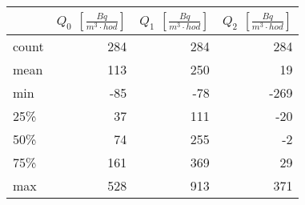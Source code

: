 \begin{tabular}{lrrr}
\toprule
{} &  $Q_0$ $\left[\si{\frac{Bq}{m^3\cdot hod}}\right]$ &  $Q_1$ $\left[\si{\frac{Bq}{m^3\cdot hod}}\right]$ &  $Q_2$ $\left[\si{\frac{Bq}{m^3\cdot hod}}\right]$ \\
\midrule
count &                                                284 &                                                284 &                                                284 \\
mean  &                                                113 &                                                250 &                                                 19 \\
min   &                                                -85 &                                                -78 &                                               -269 \\
25\%   &                                                 37 &                                                111 &                                                -20 \\
50\%   &                                                 74 &                                                255 &                                                 -2 \\
75\%   &                                                161 &                                                369 &                                                 29 \\
max   &                                                528 &                                                913 &                                                371 \\
\bottomrule
\end{tabular}
